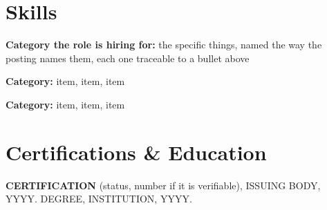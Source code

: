 \documentclass[10pt,letterpaper]{article}
\begin{document}

%

\section{Skills}

{\footnotesize
\noindent\textbf{Category the role is hiring for:} the specific things, named
the way the posting names them, each one traceable to a bullet above\par\vspace{1pt}
\noindent\textbf{Category:} item, item, item\par\vspace{1pt}
\noindent\textbf{Category:} item, item, item\par}


\section{Certifications \& Education}

{\footnotesize\noindent \textbf{CERTIFICATION} (status, number if it is
verifiable), ISSUING BODY, YYYY. DEGREE, INSTITUTION, YYYY.\par}
\end{document}
